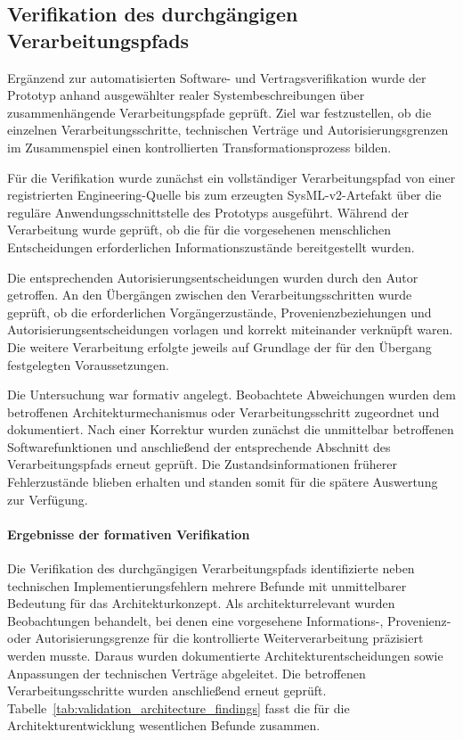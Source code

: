 \subsection{Verifikation des durchgängigen Verarbeitungspfads}
\label{sec:validation_e2e_multisource}

Ergänzend zur automatisierten Software- und Vertragsverifikation wurde der
Prototyp anhand ausgewählter realer Systembeschreibungen über
zusammenhängende Verarbeitungspfade geprüft. Ziel war festzustellen, ob die
einzelnen Verarbeitungsschritte, technischen Verträge und
Autorisierungsgrenzen im Zusammenspiel einen kontrollierten
Transformationsprozess bilden.

Für die Verifikation wurde zunächst ein vollständiger Verarbeitungspfad von
einer registrierten Engineering-Quelle bis zum erzeugten
SysML-v2-Artefakt über die reguläre Anwendungsschnittstelle des Prototyps
ausgeführt. Während der Verarbeitung wurde geprüft, ob die für die
vorgesehenen menschlichen Entscheidungen erforderlichen Informationszustände
bereitgestellt wurden. 

\noindent Die entsprechenden Autorisierungsentscheidungen
wurden durch den Autor getroffen. An den Übergängen zwischen den
Verarbeitungsschritten wurde geprüft, ob die erforderlichen
Vorgängerzustände, Provenienzbeziehungen und Autorisierungsentscheidungen
vorlagen und korrekt miteinander verknüpft waren. Die weitere Verarbeitung
erfolgte jeweils auf Grundlage der für den Übergang festgelegten
Voraussetzungen.

Die Untersuchung war formativ angelegt. Beobachtete Abweichungen wurden dem
betroffenen Architekturmechanismus oder Verarbeitungsschritt zugeordnet und
dokumentiert. Nach einer Korrektur wurden zunächst die unmittelbar
betroffenen Softwarefunktionen und anschließend der entsprechende Abschnitt
des Verarbeitungspfads erneut geprüft. Die Zustandsinformationen früherer
Fehlerzustände blieben erhalten und standen somit für die spätere
Auswertung zur Verfügung.

\paragraph{Ergebnisse der formativen Verifikation}

Die Verifikation des durchgängigen Verarbeitungspfads identifizierte neben
technischen Implementierungsfehlern mehrere Befunde mit unmittelbarer
Bedeutung für das Architekturkonzept. Als architekturrelevant wurden
Beobachtungen behandelt, bei denen eine vorgesehene Informations-,
Provenienz- oder Autorisierungsgrenze für die kontrollierte
Weiterverarbeitung präzisiert werden musste. Daraus wurden dokumentierte
Architekturentscheidungen sowie Anpassungen der technischen Verträge
abgeleitet. Die betroffenen Verarbeitungsschritte wurden anschließend erneut
geprüft.
\noindent
Tabelle~\ref{tab:validation_architecture_findings} fasst die für die
Architekturentwicklung wesentlichen Befunde zusammen.

